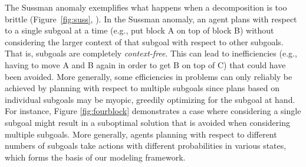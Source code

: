 \documentclass[10pt,letterpaper]{article}
\begin{document}
The Sussman anomaly exemplifies what happens when a decomposition is too  brittle (Figure~\ref{fig:suss}, \citealp{Sussman1975}). In the Sussman anomaly, an agent plans with respect to a single subgoal at a time (e.g., put block A on top of block B) without considering the larger context of that subgoal with respect to other subgoals. That is, subgoals are completely \textit{context-free}. This can lead to inefficiencies (e.g., having to move A and B again in order to get B on top of C) that could have been avoided. More generally, some efficiencies in problems can only reliably be achieved by planning with respect to multiple subgoals since plans based on individual subgoals may be myopic, greedily optimizing for the subgoal at hand. For instance, Figure \ref{fig:fourblock} demonstrates a case where considering a single subgoal might result in a suboptimal solution that is avoided when considering multiple subgoals. More generally, agents planning with respect to different numbers of subgoals take actions with different probabilities in various states, which forms the basis of our modeling framework.



\end{document}

